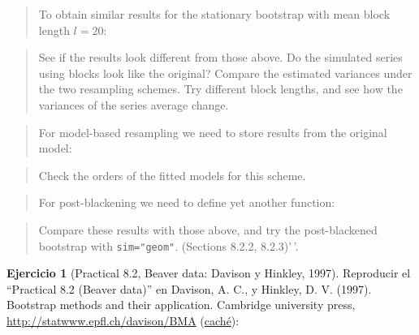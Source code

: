 \documentclass[
]{book}
\newenvironment{Shaded}{\begin{snugshade}}{\end{snugshade}}
\newcommand{\CommentTok}[1]{\textcolor[rgb]{0.56,0.35,0.01}{\textit{#1}}}
\newcommand{\FloatTok}[1]{\textcolor[rgb]{0.00,0.00,0.81}{#1}}
\newcommand{\FunctionTok}[1]{\textcolor[rgb]{0.00,0.00,0.00}{#1}}
\newcommand{\NormalTok}[1]{#1}
\newcommand{\OtherTok}[1]{\textcolor[rgb]{0.56,0.35,0.01}{#1}}
\newcommand{\SpecialCharTok}[1]{\textcolor[rgb]{0.00,0.00,0.00}{#1}}
\theoremstyle{break}
\theoremstyle{definition}
\theoremstyle{definition}
\theoremstyle{definition}
\newtheorem{exercise}{Ejercicio}[chapter]
\theoremstyle{definition}
\theoremstyle{remark}
\begin{document}
\begin{quote}
To obtain similar results for the stationary
bootstrap with mean block length \(l = 20\):
\end{quote}

\begin{Shaded}
\end{Shaded}

\begin{quote}
See if the results look different from those above.
Do the simulated series using blocks look like the original?
Compare the estimated variances under the two resampling schemes.
Try different block lengths, and see how
the variances of the series average change.
\end{quote}

\begin{quote}
For model-based resampling we need to store results from the original model:
\end{quote}

\begin{quote}
Check the orders of the fitted models for this scheme.
\end{quote}

\begin{quote}
For post-blackening we need to define yet another function:
\end{quote}

\begin{quote}
Compare these results with those above, and try the post-blackened bootstrap with \texttt{sim="geom"}.
(Sections 8.2.2, 8.2.3)'\,'.
\end{quote}

\begin{exercise}[Practical 8.2, Beaver data: Davison y Hinkley, 1997]
\protect\hypertarget{exr:tsboot-beaver}{}{\label{exr:tsboot-beaver} \iffalse (Practical 8.2, Beaver data: Davison y Hinkley, 1997) \fi{} }
Reproducir el ``Practical 8.2 (Beaver data)'' en Davison, A. C., y Hinkley, D. V. (1997). Bootstrap methods and their application. Cambridge university press, \url{http://statwww.epfl.ch/davison/BMA}
(\href{http://webcache.googleusercontent.com/search?q=cache:a4nFL5ymMMoJ:statwww.epfl.ch/davison/BMA/+\&cd=1\&hl=gl\&ct=clnk\&gl=es}{caché}):
\end{exercise}
\end{document}
